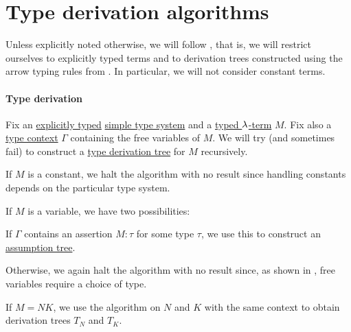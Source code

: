 \section{Type derivation algorithms}\label{sec:type_derivation_algorithms}

Unless explicitly noted otherwise, we will follow , that is, we will restrict ourselves to explicitly typed terms and to derivation trees constructed using the arrow typing rules from . In particular, we will not consider constant terms.

\paragraph{Type derivation}

\begin{algorithm}\label{alg:simply_typed_term_type_derivation}
  Fix an \hyperref[def:simple_type_system_style]{explicitly typed} \hyperref[def:simple_type_system]{simple type system} and a \hyperref[def:typed_lambda_term]{typed \( \mathrm{\lambda} \)-term} \( M \). Fix also a \hyperref[def:type_context]{type context} \( \Gamma \) containing the free variables of \( M \). We will try (and sometimes fail) to construct a \hyperref[def:type_derivation_tree]{type derivation tree} for \( M \) recursively.

  \begin{thmenum}
     If \( M \) is a constant, we halt the algorithm with no result since handling constants depends on the particular type system.

     If \( M \) is a variable, we have two possibilities:
    \begin{thmenum}
       If \( \Gamma \) contains an assertion \( M: \tau \) for some type \( \tau \), we use this to construct an \hyperref[def:type_derivation_tree/assumption]{assumption tree}.

       Otherwise, we again halt the algorithm with no result since, as shown in , free variables require a choice of type.
    \end{thmenum}

     If \( M = NK \), we use the algorithm on \( N \) and \( K \) with the same context to obtain derivation trees \( T_N \) and \( T_K \).


\end{thmenum}
\end{algorithm}
